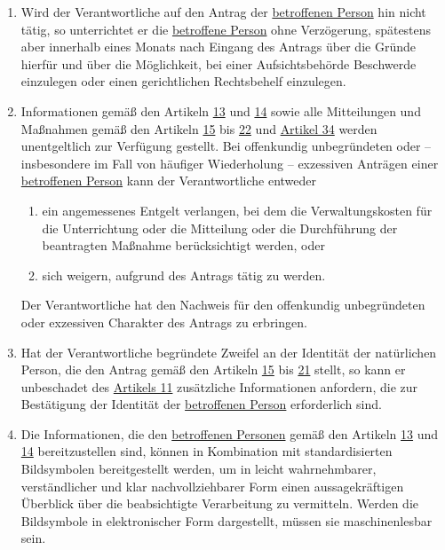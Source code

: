 \begin{enumerate}
  \item Wird der Verantwortliche auf den Antrag der \hyperref[itm:04-1]{betroffenen Person} hin nicht tätig, so unterrichtet er die
   \hyperref[itm:04-1]{betroffene Person} ohne Verzögerung, spätestens aber innerhalb eines Monats nach Eingang des Antrags über die Gründe
   hierfür und über die Möglichkeit, bei einer Aufsichtsbehörde Beschwerde einzulegen oder einen gerichtlichen
   Rechtsbehelf einzulegen.
  \label{itm:12-4}

  \item Informationen gemäß den Artikeln \hyperref[ch:13]{13} und \hyperref[ch:14]{14} sowie alle Mitteilungen und
   Maßnahmen gemäß den Artikeln \hyperref[ch:15]{15} bis \hyperref[ch:22]{22} und \hyperref[ch:34]{Artikel 34} werden
   unentgeltlich zur Verfügung gestellt. Bei offenkundig unbegründeten oder -- insbesondere im Fall von häufiger
   Wiederholung -- exzessiven Anträgen einer \hyperref[itm:04-1]{betroffenen Person} kann der Verantwortliche entweder
  \label{itm:12-5}

  \begin{enumerate}
  
    \item ein angemessenes Entgelt verlangen, bei dem die Verwaltungskosten für die Unterrichtung oder die Mitteilung
     oder die Durchführung der beantragten Maßnahme berücksichtigt werden, oder
    \label{itm:12-5a}

    \item sich weigern, aufgrund des Antrags tätig zu werden.
    \label{itm:12-5b}

  \end{enumerate}

  Der Verantwortliche hat den Nachweis für den offenkundig unbegründeten oder exzessiven Charakter des Antrags zu
  erbringen.

  \item Hat der Verantwortliche begründete Zweifel an der Identität der natürlichen Person, die den Antrag gemäß den
   Artikeln \hyperref[ch:15]{15} bis \hyperref[ch:21]{21} stellt, so kann er unbeschadet des \hyperref[ch:11]
   {Artikels 11} zusätzliche Informationen anfordern, die zur Bestätigung der Identität der \hyperref[itm:04-1]{betroffenen Person}
   erforderlich sind.
  \label{itm:12-6}

  \item Die Informationen, die den \hyperref[itm:04-1]{betroffenen Personen} gemäß den Artikeln \hyperref[ch:13]{13} und \hyperref[ch:14]
   {14} bereitzustellen sind, können in Kombination mit standardisierten Bildsymbolen bereitgestellt werden, um in
   leicht wahrnehmbarer, verständlicher und klar nachvollziehbarer Form einen aussagekräftigen Überblick über die
   beabsichtigte Verarbeitung zu vermitteln. Werden die Bildsymbole in elektronischer Form dargestellt, müssen sie
   maschinenlesbar sein.
  \label{itm:12-7}


\end{enumerate}
